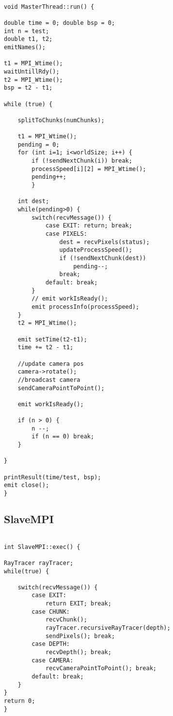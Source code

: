 	
\begin{lstlisting}

void MasterThread::run() {

double time = 0; double bsp = 0;
int n = test;
double t1, t2;
emitNames();

t1 = MPI_Wtime();
waitUntillRdy();
t2 = MPI_Wtime();
bsp = t2 - t1;

while (true) {

    splitToChunks(numChunks);

    t1 = MPI_Wtime();
    pending = 0;
    for (int i=1; i<worldSize; i++) {
        if (!sendNextChunk(i)) break;
        processSpeed[i][2] = MPI_Wtime();
        pending++;
        }

    int dest;
    while(pending>0) {
        switch(recvMessage()) {
            case EXIT: return; break;
            case PIXELS:
                dest = recvPixels(status);
                updateProcessSpeed();
                if (!sendNextChunk(dest))
                    pending--;
                break;
            default: break;
        }
        // emit workIsReady();
        emit processInfo(processSpeed);
    }
    t2 = MPI_Wtime();

    emit setTime(t2-t1);
    time += t2 - t1;

    //update camera pos
    camera->rotate();
    //broadcast camera
    sendCameraPointToPoint();

    emit workIsReady();

    if (n > 0) {
        n --;
        if (n == 0) break;
    }

}

printResult(time/test, bsp);
emit close();
}

\end{lstlisting}


\subsection{SlaveMPI}

\begin{lstlisting}

int SlaveMPI::exec() {

RayTracer rayTracer;
while(true) {

    switch(recvMessage()) {
        case EXIT:
            return EXIT; break;
        case CHUNK:
            recvChunk();
            rayTracer.recursiveRayTracer(depth);
            sendPixels(); break;
        case DEPTH:
            recvDepth(); break;
        case CAMERA:
            recvCameraPointToPoint(); break;
        default: break;
    }
}
return 0;
}

\end{lstlisting}

